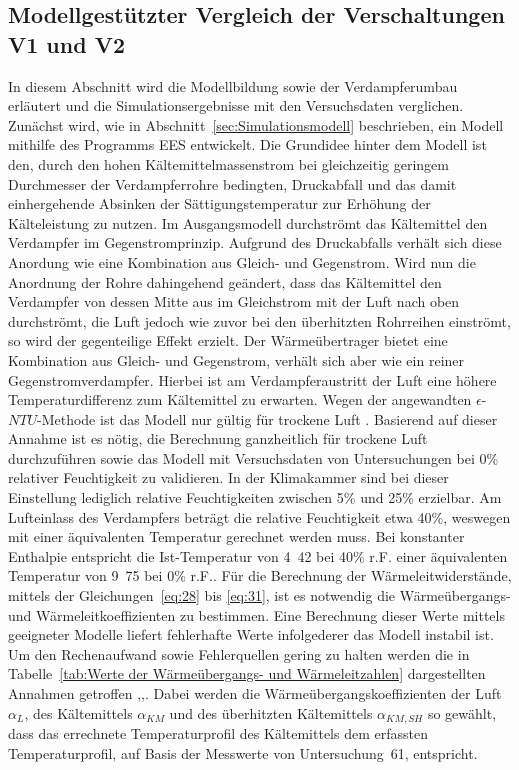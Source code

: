 \clearpage

\subsection{Modellgestützter Vergleich der Verschaltungen V1 und V2}
\label{subsec:Modellgestützter Vergleich der Verschaltungen V1 und V2}

In diesem Abschnitt wird die Modellbildung sowie der Verdampferumbau erläutert und die Simulationsergebnisse mit den Versuchsdaten verglichen.
Zunächst wird, wie in Abschnitt~\ref{sec:Simulationsmodell} beschrieben, ein Modell mithilfe des Programms EES entwickelt. 
Die Grundidee hinter dem Modell ist den, durch den hohen Kältemittelmassenstrom bei gleichzeitig geringem Durchmesser der Verdampferrohre bedingten, Druckabfall und das damit einhergehende Absinken der Sättigungstemperatur zur Erhöhung der Kälteleistung zu nutzen. Im Ausgangsmodell durchströmt das Kältemittel den Verdampfer im Gegenstromprinzip. Aufgrund des Druckabfalls verhält sich diese Anordung wie eine Kombination aus Gleich- und Gegenstrom. Wird nun die Anordnung der Rohre dahingehend geändert, dass das Kältemittel den Verdampfer von dessen Mitte aus im Gleichstrom mit der Luft nach oben durchströmt, die Luft jedoch wie zuvor bei den überhitzten Rohrreihen einströmt, so wird der gegenteilige Effekt erzielt. Der Wärmeübertrager bietet eine Kombination aus Gleich- und Gegenstrom, verhält sich aber wie ein reiner Gegenstromverdampfer. Hierbei ist am Verdampferaustritt der Luft eine höhere Temperaturdifferenz zum Kältemittel zu erwarten. 
Wegen der angewandten $\epsilon$-$NTU$-Methode ist das Modell nur gültig für trockene Luft \cite{Bergman.2011}. Basierend auf dieser Annahme ist es nötig, die Berechnung ganzheitlich für trockene Luft durchzuführen sowie das Modell mit Versuchsdaten von Untersuchungen bei \unit{0}{\%} relativer Feuchtigkeit zu validieren. In der Klimakammer sind bei dieser Einstellung lediglich relative Feuchtigkeiten zwischen \unit{5}{\%} und \unit{25}{\%} erzielbar. Am Lufteinlass des Verdampfers beträgt die relative Feuchtigkeit etwa \unit{40}{\%}, weswegen mit einer äquivalenten Temperatur gerechnet werden muss. Bei konstanter Enthalpie entspricht die Ist-Temperatur von \unit{4.42}{\celsius} bei \unit{40}{\%} r.F. einer äquivalenten Temperatur von \unit{9.75}{\celsius} bei \unit{0}{\%} r.F.. \newline
Für die Berechnung der Wärmeleitwiderstände, mittels der Gleichungen~\ref{eq:28} bis \ref{eq:31}, ist es notwendig die Wärmeübergangs- und Wärmeleitkoeffizienten zu bestimmen. Eine Berechnung dieser Werte mittels geeigneter Modelle liefert fehlerhafte Werte infolgederer das Modell instabil ist. Um den Rechenaufwand sowie Fehlerquellen gering zu halten werden die in Tabelle~\ref{tab:Werte der Wärmeübergangs- und Wärmeleitzahlen} dargestellten Annahmen getroffen \cite{Bergman.2011},\cite{Recknagel.2005},\cite{DINDeutschesInstitutfurNormunge.V..2017d}. Dabei werden die Wärmeübergangskoeffizienten der Luft $\alpha_L$, des Kältemittels $\alpha_{KM}$ und des überhitzten Kältemittels $\alpha_{KM,SH}$ so gewählt, dass das errechnete Temperaturprofil des Kältemittels dem erfassten Temperaturprofil, auf Basis der Messwerte von Untersuchung~61, entspricht. 
